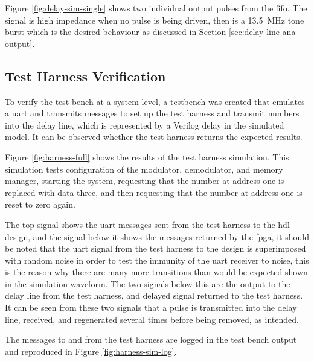 Figure \ref{fig:delay-sim-single} shows two individual output pulses from the \gls{fifo}. The signal is high impedance when no pulse is being driven, then is a \SI{13.5}{\mega\hertz} tone burst which is the desired behaviour as discussed in Section \ref{sec:delay-line-ana-output}.

\subsection{Test Harness Verification}
To verify the test bench at a system level, a testbench was created that emulates a \gls{uart} and transmits messages to set up the test harness and transmit numbers into the delay line, which is represented by a Verilog delay in the simulated model. It can be observed whether the test harness returns the expected results.

Figure \ref{fig:harness-full} shows the results of the test harness simulation. This simulation tests configuration of the modulator, demodulator, and memory manager, starting the system, requesting that the number at address one is replaced with data three, and then requesting that the number at address one is reset to zero again.

The top signal shows the \gls{uart} messages sent from the test harness to the \gls{hdl} design, and the signal below it shows the messages returned by the \gls{fpga}, it should be noted that the \gls{uart} signal from the test harness to the design is superimposed with random noise in order to test the immunity of the \gls{uart} receiver to noise, this is the reason why there are many more transitions than would be expected shown in the simulation waveform. The two signals below this are the output to the delay line from the test harness, and delayed signal returned to the test harness. It can be seen from these two signals that a pulse is transmitted into the delay line, received, and regenerated several times before being removed, as intended.

The messages to and from the test harness are logged in the test bench output and reproduced in Figure \ref{fig:harness-sim-log}.

